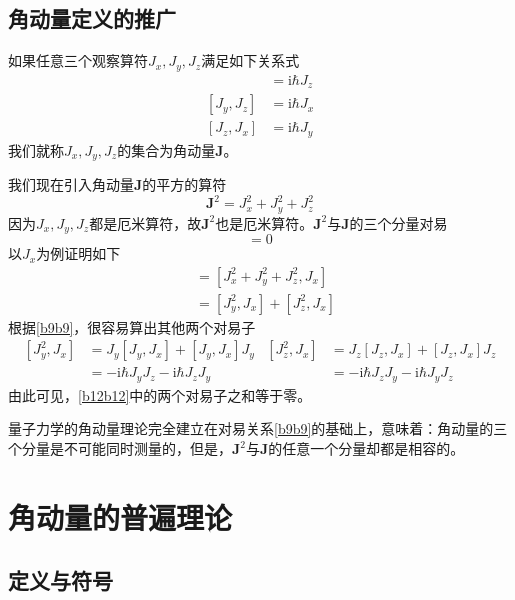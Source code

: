 \documentclass[]{article}
\begin{document}
\subsection{角动量定义的推广}
如果任意三个观察算符$J_x,J_y,J_z$满足如下关系式
\begin{align}
	[J_x,J_y]&=\mathrm{i}\hbar J_z\nonumber\\
	[J_y,J_z]&=\mathrm{i}\hbar J_x\nonumber\\
	[J_z,J_x]&=\mathrm{i}\hbar J_y	
	\label{b9b9}
\end{align}
我们就称$J_x,J_y,J_z$的集合为角动量$\boldsymbol{J}$。\par 
我们现在引入角动量$\boldsymbol{J}$的平方的算符
\begin{equation}
	\boldsymbol{J}^2=J_x^2+J_y^2+J_z^2
	\label{b10b10}
\end{equation}
因为$J_x,J_y,J_z$都是厄米算符，故$\boldsymbol{J}^2$也是厄米算符。$\boldsymbol{J}^2$与$\boldsymbol{J}$的三个分量对易
\begin{equation}
	[\boldsymbol{J}^2,\boldsymbol{J}]=0
	\label{b11b11}
\end{equation}
以$J_x$为例证明如下
\begin{align}
	[\boldsymbol{J}^2,J_x]&=[J_x^2+J_y^2+J_z^2,J_x]\nonumber\\
	&=[J_y^2,J_x]+[J_z^2,J_x]
	\label{b12b12}
\end{align}
根据\eqref{b9b9}，很容易算出其他两个对易子
\begin{subequations}
	\begin{align}
		[J_y^2,J_x]&=J_y[J_y,J_x]+[J_y,J_x]J_y\nonumber\\
		&=-\mathrm{i}\hbar J_yJ_z-\mathrm{i}\hbar J_zJ_y
	\end{align}
	\begin{align}
		[J_z^2,J_x]&=J_z[J_z,J_x]+[J_z,J_x]J_z\nonumber\\
		&=-\mathrm{i}\hbar J_zJ_y-\mathrm{i}\hbar J_yJ_z
	\end{align}
\end{subequations}
由此可见，\eqref{b12b12}中的两个对易子之和等于零。\par 
量子力学的角动量理论完全建立在对易关系\eqref{b9b9}的基础上，意味着：角动量的三个分量是不可能同时测量的，但是，$\boldsymbol{J}^2$与$\boldsymbol{J}$的任意一个分量却都是相容的。
\section{角动量的普遍理论}
\subsection{定义与符号}
\end{document}

